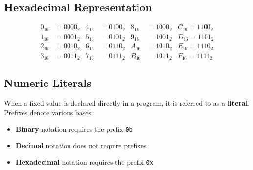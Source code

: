 \documentclass[a4paper]{report}
\begin{document}
\subsection{Hexadecimal Representation}
\begin{align*}
    0_{16} & = 0000_2 & 4_{16} & = 0100_2 & 8_{16} & = 1000_2 & C_{16} = 1100_2  \\
    1_{16} & = 0001_2 & 5_{16} & = 0101_2 & 9_{16} & = 1001_2 & D_{16} = 1101_2  \\
    2_{16} & = 0010_2 & 6_{16} & = 0110_2 & A_{16} & = 1010_2 & E_{16} = 1110_2  \\
    3_{16} & = 0011_2 & 7_{16} & = 0111_2 & B_{16} & = 1011_2 & F_{16} = 1111_2
\end{align*}
\subsection{Numeric Literals}
When a fixed value is declared directly in a program, it is referred to
as a \textbf{literal}. Prefixes denote various bases:
\begin{itemize}
    \item \textbf{Binary} notation requires the prefix \texttt{0b}
    \item \textbf{Decimal} notation does not require prefixes
    \item \textbf{Hexadecimal} notation requires the prefix \texttt{0x}
\end{itemize}
\end{document}
